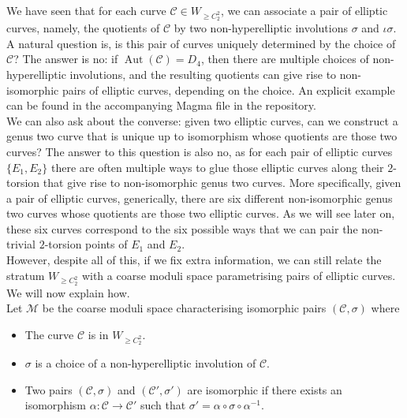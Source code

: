 \documentclass{amsart}
\newcommand{\calC}{\mathcal{C}}
\newcommand{\calM}{\mathcal{M}}
\DeclareMathOperator{\Aut}{Aut}
\numberwithin{equation}{section}
\theoremstyle{definition}
\theoremstyle{remark}
\begin{document}
We have seen that for each curve $\calC\in W_{\geq C_2^2}$, we can associate a pair of elliptic curves, namely, the quotients of $\calC$ by two non-hyperelliptic involutions $\sigma$ and $\iota\sigma$. A natural question is, is this pair of curves uniquely determined by the choice of $\calC$? The answer is no: if $\Aut(\mathcal{C}) = D_4$, then there are multiple choices of non-hyperelliptic involutions, and the resulting quotients can give rise to non-isomorphic pairs of elliptic curves, depending on the choice. An explicit example can be found in the accompanying Magma file in the repository.\\

We can also ask about the converse: given two elliptic curves, can we construct a genus two curve that is unique up to isomorphism whose quotients are those two curves? The answer to this question is also no, as for each pair of elliptic curves $\{E_1,E_2\}$ there are often multiple ways to glue those elliptic curves along their $2$-torsion that give rise to non-isomorphic genus two curves. More specifically, given a pair of elliptic curves, generically, there are six different non-isomorphic genus two curves whose quotients are those two elliptic curves. As we will see later on, these six curves correspond to the six possible ways that we can pair the non-trivial $2$-torsion points of $E_1$ and $E_2$.\\

However, despite all of this, if we fix extra information, we can still relate the stratum $W_{\geq C_2^2}$ with a coarse moduli space parametrising pairs of elliptic curves. We will now explain how.\\

Let $\calM$ be the coarse moduli space characterising isomorphic pairs $(\calC,\sigma)$ where 
\begin{itemize}
    \item The curve $\calC$ is in $W_{\geq C_2^2}$.
    \item $\sigma$ is a choice of a non-hyperelliptic involution of $\calC$.
    \item Two pairs $(\calC,\sigma)$ and $(\calC',\sigma')$ are isomorphic if there exists an isomorphism $\alpha:\calC\rightarrow\calC'$ such that $\sigma'=\alpha\circ\sigma\circ\alpha^{-1}.$\\
\end{itemize}
\end{document}
